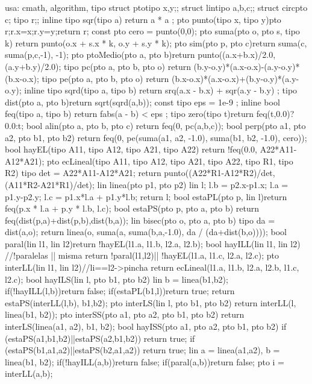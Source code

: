 \documentclass[10pt,landscape,twocolumn,a4paper,notitlepage]{article}
\begin{document}
\begin{code}
usa: cmath, algorithm, tipo
struct pto{tipo x,y;};
struct lin{tipo a,b,c;};
struct circ{pto c; tipo r;};
inline tipo sqr(tipo a) { return a * a ; }
pto punto(tipo x, tipo y){pto r;r.x=x;r.y=y;return r;}
const pto cero = punto(0,0);
pto suma(pto o, pto s, tipo k){
  return punto(o.x + s.x * k, o.y + s.y * k);
}
pto sim(pto p, pto c){return suma(c, suma(p,c,-1), -1);}
pto ptoMedio(pto a, pto b){return punto((a.x+b.x)/2.0,(a.y+b.y)/2.0);}
tipo pc(pto a, pto b, pto o){
  return (b.y-o.y)*(a.x-o.x)-(a.y-o.y)*(b.x-o.x);
}
tipo pe(pto a, pto b, pto o){
  return (b.x-o.x)*(a.x-o.x)+(b.y-o.y)*(a.y-o.y);
}
inline tipo sqrd(tipo a, tipo b) { return srq(a.x - b.x) + sqr(a.y - b.y) ; }
tipo dist(pto a, pto b){return sqrt(sqrd(a,b));}
const tipo eps = 1e-9 ;
inline bool feq(tipo a, tipo b) { return fabs(a - b) < eps ; }
tipo zero(tipo t){return feq(t,0.0)?0.0:t;}
bool alin(pto a, pto b, pto c){  return feq(0, pc(a,b,c));}
bool perp(pto a1, pto a2, pto b1, pto b2){
  return feq(0, pe(suma(a1, a2, -1.0), suma(b1, b2, -1.0), cero));
}
bool hayEL(tipo A11, tipo A12, tipo A21, tipo A22){
  return !feq(0.0, A22*A11-A12*A21);
}
pto ecLineal(tipo A11, tipo A12, tipo A21, tipo A22, tipo R1, tipo R2){
  tipo det = A22*A11-A12*A21;
  return punto((A22*R1-A12*R2)/det,(A11*R2-A21*R1)/det);
}
lin linea(pto p1, pto p2){
  lin l;
  l.b = p2.x-p1.x;
  l.a = p1.y-p2.y;
  l.c = p1.x*l.a + p1.y*l.b;
  return l;
}
bool estaPL(pto p, lin l){return feq(p.x * l.a + p.y * l.b, l.c);}
bool estaPS(pto p, pto a, pto b){
  return feq(dist(p,a)+dist(p,b),dist(b,a));
}
lin bisec(pto o, pto a, pto b){
  tipo da = dist(a,o);
  return linea(o, suma(a, suma(b,a,-1.0), da / (da+dist(b,o))));
}
bool paral(lin l1, lin l2){return !hayEL(l1.a, l1.b, l2.a, l2.b);}
bool hayILL(lin l1, lin l2){ //!paralelas || misma
  return !paral(l1,l2)|| !hayEL(l1.a, l1.c, l2.a, l2.c);
}
pto interLL(lin l1, lin l2){//li==l2->pincha
  return ecLineal(l1.a, l1.b, l2.a, l2.b, l1.c, l2.c);
}
bool hayILS(lin l, pto b1, pto b2){
  lin b = linea(b1,b2);
  if(!hayILL(l,b))return false;
  if(estaPL(b1,l))return true;
  return estaPS(interLL(l,b), b1,b2);
}
pto interLS(lin l, pto b1, pto b2){
  return interLL(l, linea(b1, b2));
}
pto interSS(pto a1, pto a2, pto b1, pto b2){
  return interLS(linea(a1, a2), b1, b2);
}
bool hayISS(pto a1, pto a2, pto b1, pto b2){
  if (estaPS(a1,b1,b2)||estaPS(a2,b1,b2)) return true;
  if (estaPS(b1,a1,a2)||estaPS(b2,a1,a2)) return true;
  lin a = linea(a1,a2), b = linea(b1, b2);
  if(!hayILL(a,b))return false;
  if(paral(a,b))return false;
  pto i = interLL(a,b);
}
\end{code}
\end{document}
